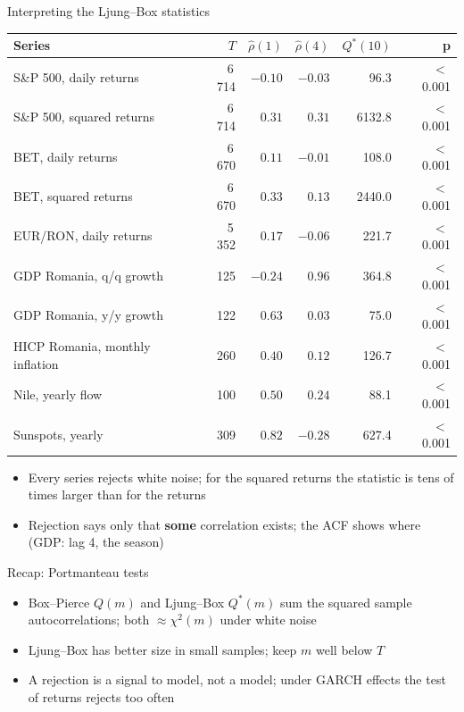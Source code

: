 \begin{frame}{Interpreting the Ljung--Box statistics}
\itemsize{\footnotesize}
\begin{center}
\scriptsize
\begin{tabular}{lrrrrr}
\toprule
Series & $T$ & $\hat\rho(1)$ & $\hat\rho(4)$ & $Q^*(10)$ & p \\
\midrule
S\&P 500, daily returns & 6\,714 & $\ensuremath{-}0.10$ & $\ensuremath{-}0.03$ & 96.3 & $<$\,0.001 \\
S\&P 500, squared returns & 6\,714 & $0.31$ & $0.31$ & 6132.8 & $<$\,0.001 \\
BET, daily returns & 6\,670 & $0.11$ & $\ensuremath{-}0.01$ & 108.0 & $<$\,0.001 \\
BET, squared returns & 6\,670 & $0.33$ & $0.13$ & 2440.0 & $<$\,0.001 \\
EUR/RON, daily returns & 5\,352 & $0.17$ & $\ensuremath{-}0.06$ & 221.7 & $<$\,0.001 \\
GDP Romania, q/q growth & 125 & $\ensuremath{-}0.24$ & $0.96$ & 364.8 & $<$\,0.001 \\
GDP Romania, y/y growth & 122 & $0.63$ & $0.03$ & 75.0 & $<$\,0.001 \\
HICP Romania, monthly inflation & 260 & $0.40$ & $0.12$ & 126.7 & $<$\,0.001 \\
Nile, yearly flow & 100 & $0.50$ & $0.24$ & 88.1 & $<$\,0.001 \\
Sunspots, yearly & 309 & $0.82$ & $\ensuremath{-}0.28$ & 627.4 & $<$\,0.001 \\
\bottomrule
\end{tabular}
\end{center}
\begin{itemize}
    \item Every series rejects white noise; for the squared returns the statistic is tens of times larger than for the returns
    \item Rejection says only that \textbf{some} correlation exists; the ACF shows where (GDP: lag 4, the season)
\end{itemize}
\end{frame}

\begin{frame}{Recap: Portmanteau tests}
\itemsize{\small}
\begin{itemize}
    \item Box--Pierce $Q(m)$ and Ljung--Box $Q^*(m)$ sum the squared sample autocorrelations; both $\approx \chi^2(m)$ under white noise
    \item Ljung--Box has better size in small samples; keep $m$ well below $T$
    \item A rejection is a signal to model, not a model; under GARCH effects the test of returns rejects too often
\end{itemize}
\end{frame}


